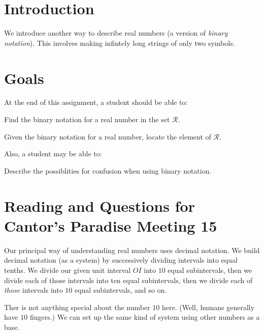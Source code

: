 \documentclass[12pt,letterpaper]{article}
\theoremstyle{definition}
\begin{document}
\setlength{\parskip}{1ex plus 0.5ex minus 0.2ex}
\setlength{\parindent}{0pt}

\pagestyle{fancy}
\cfoot{}

\section*{Introduction}
We introduce another way to describe real numbers (a version of \emph{binary notation}).
This involves making infintely long strings of only two symbols.

\section*{Goals}
At the end of this assignment, a student should be able to:
\begin{compactitem}
\item Find the binary notation for a real number in the set $\mathcal{R}$.
\item Given the binary notation for a real number, locate the element of $\mathcal{R}$.
\end{compactitem}
Also, a student may be able to:
\begin{compactitem}
\item Describe the possiblities for confusion when using binary notation.
\end{compactitem}

\section*{Reading and Questions for Cantor's Paradise Meeting 15}

Our principal way of understanding real numbers uses decimal notation.
We build decimal notation (as a system) by successively dividing intervals into equal tenths.
We divide our given unit interval $OI$ into $10$ equal subintervals, then we divide each of those intervals into ten equal subintervals, then we divide each of \emph{those} intervals into $10$ equal subintervals, and so on.


Ther is not anything special about the number $10$ here.
(Well, humans generally have $10$ fingers.)
We can set up the same kind of system using other numbers as a base.
\end{document}
